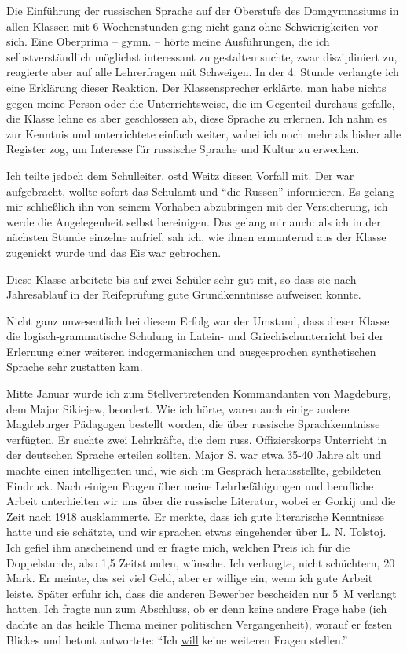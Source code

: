  Die Einführung der russischen Sprache auf der Oberstufe des Domgymnasiums in allen Klassen mit 6 Wochenstunden ging nicht ganz ohne Schwierigkeiten vor sich. Eine Oberprima -- gymn. -- hörte meine Ausführungen, die ich selbstverständlich möglichst interessant zu gestalten suchte, zwar diszipliniert zu, reagierte aber auf alle Lehrerfragen mit Schweigen. In der 4. Stunde verlangte ich eine Erklärung dieser Reaktion. Der Klassensprecher erklärte, man habe nichts gegen meine Person oder die Unterrichtsweise, die im Gegenteil durchaus gefalle, die Klasse lehne es aber geschlossen ab, diese Sprache zu erlernen. Ich nahm es zur Kenntnis und unterrichtete einfach weiter, wobei ich noch mehr als bisher alle Register zog, um Interesse für russische Sprache und Kultur zu erwecken.

Ich teilte jedoch dem Schulleiter, \ac{ostd} Weitz diesen Vorfall mit. Der war aufgebracht, wollte sofort das Schulamt und \enquote{die Russen} informieren. Es gelang mir schließlich ihn von seinem Vorhaben abzubringen mit der Versicherung, ich werde die Angelegenheit selbst bereinigen. Das gelang mir auch: als ich in der nächsten Stunde einzelne aufrief, sah ich, wie ihnen ermunternd aus der Klasse zugenickt wurde und das Eis war gebrochen.

Diese Klasse arbeitete bis auf zwei Schüler sehr gut mit, so dass sie nach Jahresablauf in der Reifeprüfung gute Grundkenntnisse aufweisen konnte.

Nicht ganz unwesentlich bei diesem Erfolg  war der Umstand, dass dieser Klasse die logisch-grammatische Schulung in Latein- und Griechischunterricht bei der Erlernung einer weiteren indogermanischen und ausgesprochen synthetischen Sprache sehr zustatten kam.

Mitte Januar wurde ich zum Stellvertretenden Kommandanten von Magdeburg, dem Major Sikiejew, beordert. Wie ich hörte, waren auch einige andere Magdeburger Pädagogen bestellt worden, die über russische Sprachkenntnisse verfügten. Er suchte zwei Lehrkräfte, die dem russ. Offizierskorps Unterricht in der deutschen Sprache erteilen sollten. Major S. war etwa 35-40 Jahre alt und machte einen intelligenten und, wie sich im Gespräch herausstellte, gebildeten Eindruck. Nach einigen Fragen über meine Lehrbefähigungen und berufliche Arbeit unterhielten wir uns über die russische Literatur, wobei er Gorkij und die Zeit nach 1918 ausklammerte. Er merkte, dass ich gute literarische Kenntnisse hatte und sie schätzte, und wir sprachen etwas eingehender über L. N. Tolstoj. Ich gefiel ihm anscheinend und er fragte mich, welchen Preis ich für die Doppelstunde, also 1,5 Zeitstunden, wünsche. Ich verlangte, nicht schüchtern, 20 Mark. Er meinte, das sei viel Geld, aber er willige ein, wenn ich gute Arbeit leiste. Später erfuhr ich, dass die anderen Bewerber bescheiden nur 5~M verlangt hatten. Ich fragte nun zum Abschluss, ob er denn keine andere Frage habe (ich dachte an das heikle Thema meiner politischen  Vergangenheit), worauf er festen Blickes und betont antwortete: \enquote{Ich \underline{will} keine weiteren Fragen stellen.}

